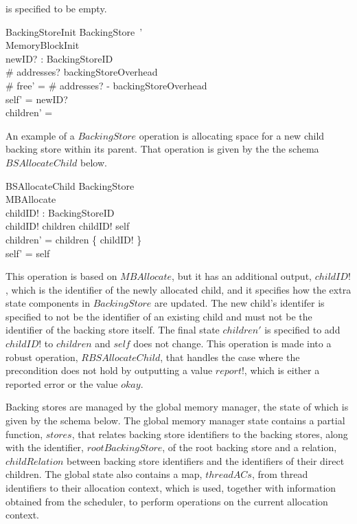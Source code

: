 \documentclass[a4paper,10pt]{report}
\begin{document}
is specified to be empty.
\begin{schema}{BackingStoreInit}
  BackingStore~' \\
  MemoryBlockInit \\
  newID? : BackingStoreID \\
\where
  \# addresses? \geq backingStoreOverhead \\
  \# free' = \# addresses? - backingStoreOverhead \\
  self' = newID? \\
  children' = \emptyset \\
\end{schema}
%
An example of a $BackingStore$ operation is allocating space for a new child
backing store within its parent. That operation is given by the the schema
$BSAllocateChild$ below.
%
\begin{schema}{BSAllocateChild}
  \Delta BackingStore \\
  MBAllocate \\
  childID! : BackingStoreID \\
  \where
  childID! \notin children \land childID! \neq self \\
  children' = children \cup \{ childID! \} \\
  self' = self
\end{schema}
%
This operation is based on $MBAllocate$, but it has an additional output,
$childID!$, which is the identifier of the newly allocated child, and it
specifies how the extra state components in $BackingStore$ are updated. The new
child's identifer is specified to not be the identifier of an existing child and
must not be the identifier of the backing store itself. The final state
$children'$ is specified to add $childID!$ to $children$ and $self$ does not
change. This operation is made into a robust operation, $RBSAllocateChild$, that
handles the case where the precondition does not hold by outputting a value
$report!$, which is either a reported error or the value $okay$.

Backing stores are managed by the global memory manager, the state of which is
given by the schema below. The global memory manager state contains a partial
function, $stores$, that relates backing store identifiers to the backing
stores, along with the identifier, $rootBackingStore$, of the root backing store
and a relation, $childRelation$ between backing store identifiers and the
identifiers of their direct children. The global state also contains a map,
$threadACs$, from thread identifiers to their allocation context, which is used,
together with information obtained from the scheduler, to perform operations on
the current allocation context.
\end{document}
